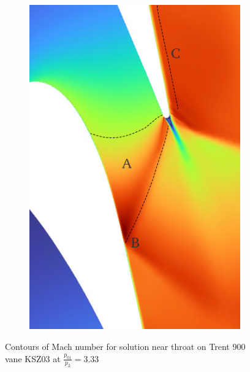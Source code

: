 \documentclass[a4paper, 11pt, oneside]{report}
\begin{document}
\begin{figure}[H]
\begin{subfigure}{.15\textwidth}
	\end{subfigure}
	\hspace{0.05\textwidth}
	\begin{subfigure}{.45\textwidth}
		\centering
		\includegraphics[width=\linewidth]{figs/t900_mach_throat.png}
	\end{subfigure}
	\caption{Contours of Mach number for solution near throat on Trent 900 vane KSZ03 at $\frac{p_{01}}{p_2}=3.33$}
	\label{fig:t900_mach_throat}
\end{figure}
\end{document}
